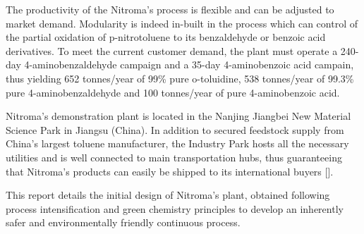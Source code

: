 The productivity of the Nitroma's process is flexible and can be adjusted to market demand. Modularity is indeed in-built in the process which can control of the partial oxidation of p-nitrotoluene to its benzaldehyde or benzoic acid derivatives. To meet the current customer demand, the plant must operate a 240-day 4-aminobenzaldehyde  campaign and a 35-day 4-aminobenzoic acid campain, thus yielding 652 tonnes/year of 99\% pure o-toluidine, 538 tonnes/year of 99.3\% pure 4-aminobenzaldehyde and 100 tonnes/year of pure 4-aminobenzoic acid.




Nitroma's demonstration plant is located in the Nanjing Jiangbei New Material Science Park in Jiangsu (China). In addition to secured feedstock supply from China’s largest toluene manufacturer, the Industry Park hosts all the necessary utilities and is well connected to main transportation hubs, thus guaranteeing that Nitroma's products can easily be shipped to its international buyers []. 


This report details the initial design of Nitroma's plant, obtained following process intensification and green chemistry principles to develop an inherently safer and environmentally friendly continuous process.



